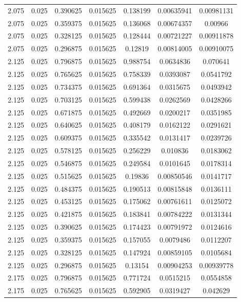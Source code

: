 \begin{flushleft}
\begin{longtable}{ccccccc}
2.075 & 0.025 & 0.390625 & 0.015625 & 0.138199 & 0.00635941 & 0.00981131  \\ 
2.075 & 0.025 & 0.359375 & 0.015625 & 0.136068 & 0.00674357 & 0.00966  \\ 
2.075 & 0.025 & 0.328125 & 0.015625 & 0.128444 & 0.00721227 & 0.00911878  \\ 
2.075 & 0.025 & 0.296875 & 0.015625 & 0.12819 & 0.00814005 & 0.00910075  \\ 
2.125 & 0.025 & 0.796875 & 0.015625 & 0.988754 & 0.0634836 & 0.070641  \\ 
2.125 & 0.025 & 0.765625 & 0.015625 & 0.758339 & 0.0393087 & 0.0541792  \\ 
2.125 & 0.025 & 0.734375 & 0.015625 & 0.691364 & 0.0315675 & 0.0493942  \\ 
2.125 & 0.025 & 0.703125 & 0.015625 & 0.599438 & 0.0262569 & 0.0428266  \\ 
2.125 & 0.025 & 0.671875 & 0.015625 & 0.492669 & 0.0200217 & 0.0351985  \\ 
2.125 & 0.025 & 0.640625 & 0.015625 & 0.408179 & 0.0162122 & 0.0291621  \\ 
2.125 & 0.025 & 0.609375 & 0.015625 & 0.335542 & 0.0131417 & 0.0239726  \\ 
2.125 & 0.025 & 0.578125 & 0.015625 & 0.256229 & 0.010836 & 0.0183062  \\ 
2.125 & 0.025 & 0.546875 & 0.015625 & 0.249584 & 0.0101645 & 0.0178314  \\ 
2.125 & 0.025 & 0.515625 & 0.015625 & 0.19836 & 0.00850546 & 0.0141717  \\ 
2.125 & 0.025 & 0.484375 & 0.015625 & 0.190513 & 0.00815848 & 0.0136111  \\ 
2.125 & 0.025 & 0.453125 & 0.015625 & 0.175062 & 0.00761611 & 0.0125072  \\ 
2.125 & 0.025 & 0.421875 & 0.015625 & 0.183841 & 0.00784222 & 0.0131344  \\ 
2.125 & 0.025 & 0.390625 & 0.015625 & 0.174423 & 0.00791972 & 0.0124616  \\ 
2.125 & 0.025 & 0.359375 & 0.015625 & 0.157055 & 0.0079486 & 0.0112207  \\ 
2.125 & 0.025 & 0.328125 & 0.015625 & 0.147924 & 0.00859105 & 0.0105684  \\ 
2.125 & 0.025 & 0.296875 & 0.015625 & 0.13154 & 0.00904253 & 0.00939778  \\ 
2.175 & 0.025 & 0.796875 & 0.015625 & 0.771724 & 0.0515215 & 0.0554858  \\ 
2.175 & 0.025 & 0.765625 & 0.015625 & 0.592905 & 0.0319427 & 0.042629  \\ 

\end{longtable}
\end{flushleft}
